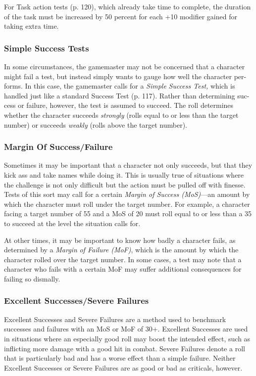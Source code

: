 For Task action tests (p. 120), which already take 
time to complete, the duration of the task must be 
increased by 50 percent for each +10 modifier gained 
for taking extra time.

\subsubsection{Simple Success Tests}

In some circumstances, the gamemaster may not be 
concerned that a character might fail a test, but instead 
simply wants to gauge how well the character per-
forms. In this case, the gamemaster calls for a \textit{Simple }
\textit{Success Test,} which is handled just like a standard 
Success Test (p. 117). Rather than determining suc-
cess or failure, however, the test is assumed to succeed. 
The roll determines whether the character succeeds 
\textit{strongly }(rolls equal to or less than the target number) 
or succeeds \textit{weakly }(rolls above the target number).

\subsubsection{Margin Of Success/Failure}

Sometimes it may be important that a character not 
only succeeds, but that they kick ass and take names 
while doing it. This is usually true of situations where 
the challenge is not only difficult but the action must 
be pulled off with finesse. Tests of this sort may call 
for a certain \textit{Margin of Success (MoS)}—an amount by 
which the character must roll under the target number. 
For example, a character facing a target number of 55 
and a MoS of 20 must roll equal to or less than a 35 
to succeed at the level the situation calls for.

At other times, it may be important to know how 
badly a character fails, as determined by a \textit{Margin }
\textit{of Failure (MoF)}, which is the amount by which the 
character rolled over the target number. In some cases, 
a test may note that a character who fails with a 
certain MoF may suffer additional consequences for 
failing so dismally.

\subsubsection{Excellent Successes/Severe Failures}

Excellent Successes and Severe Failures are a method 
used to benchmark successes and failures with an 
MoS or MoF of 30+. Excellent Successes are used in 
situations where an especially good roll may boost the 
intended effect, such as inflicting more damage with 
a good hit in combat. Severe Failures denote a roll 
that is particularly bad and has a worse effect than a 
simple failure. Neither Excellent Successes or Severe 
Failures are as good or bad as criticals, however.

